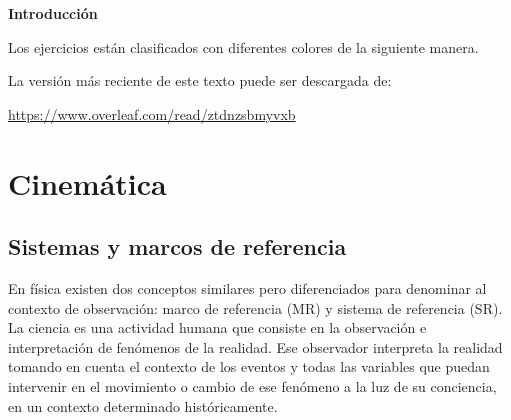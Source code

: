 \documentclass[a4paper,12pt,twoside]{book}
\begin{document}
\clearpage
\noindent
\textbf{Introducción}

Los ejercicios están clasificados con diferentes colores de la siguiente manera.

\begin{mdframed}[style=ejercicio-conceptual]
\end{mdframed}

\begin{mdframed}[style=ejercicio-facil]
\end{mdframed}

\begin{mdframed}[style=ejercicio-intermedio]
\end{mdframed}

\begin{mdframed}[style=ejercicio-dificil]
\end{mdframed}

La versión más reciente de este texto puede ser descargada de:
\begin{center}
    \url{https://www.overleaf.com/read/ztdnzsbmyvxb}
\end{center}


\tableofcontents

\mainmatter
{}


\chapter{Cinemática}


\section{Sistemas y marcos de referencia}

\begin{mdframed}[style=explicacion]
    En física existen dos conceptos similares pero diferenciados para denominar al contexto de observación: marco de referencia (MR) y sistema de referencia (SR). 
    La ciencia es una actividad humana que consiste en la observación e interpretación de fenómenos de la realidad. Ese observador interpreta la realidad tomando en cuenta el contexto de los eventos y todas las variables que puedan intervenir en el movimiento o cambio de ese fenómeno a la luz de su conciencia, en un contexto determinado históricamente.
\end{mdframed}
\end{document}
